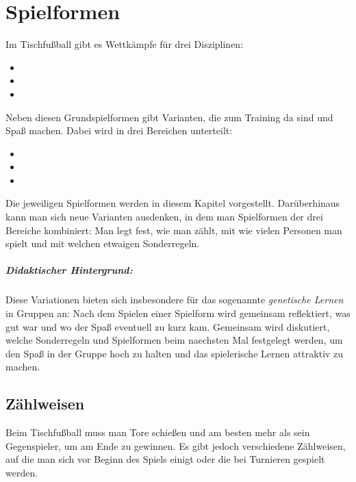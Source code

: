 \chapter{Spielformen}
\label{spielformen}

Im Tischfußball gibt es Wettkämpfe für drei Disziplinen: 
\begin{itemize}
\item {}
\item {}
\item {}
\end{itemize}
Neben diesen Grundspielformen gibt Varianten, die zum Training da sind und Spaß machen. Dabei wird in drei Bereichen unterteilt:
\begin{itemize}
\item {}
\item {}
\item {}
\end{itemize}
Die jeweiligen Spielformen werden in diesem Kapitel vorgestellt. Darüberhinaus kann man sich neue Varianten ausdenken, in dem man Spielformen der drei Bereiche kombiniert: Man legt fest, wie man zählt, mit wie vielen Personen man spielt und mit welchen etwaigen Sonderregeln.

\paragraph{Didaktischer Hintergrund:} Diese Variationen bieten sich insbesondere für das sogenannte {\it  genetische Lernen} in Gruppen an: Nach dem Spielen einer Spielform wird gemeinsam reflektiert, was gut war und wo der Spaß eventuell zu kurz kam. Gemeinsam wird diskutiert, welche Sonderregeln und Spielformen beim naechsten Mal festgelegt werden, um den Spaß in der Gruppe hoch zu halten und das spielerische Lernen attraktiv zu machen. 

\section{Zählweisen}
\label{spielformen:zaehlweisen}

Beim Tischfußball muss man Tore schießen und am besten mehr als sein Gegenspieler, um am Ende zu gewinnen.
Es gibt jedoch verschiedene Zählweisen, auf die man sich vor Beginn des Spiels einigt oder die bei Turnieren gespielt werden. 

